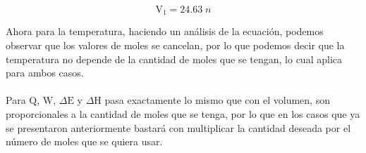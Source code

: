 \documentclass[12pt]{article}
\begin{document}
\begin{displaymath}
	\mathrm{V}_1=24.63\;n
\end{displaymath}

Ahora para la temperatura, haciendo un análisis de la ecuación, podemos observar que los valores de moles se cancelan, por lo que podemos decir que la temperatura no depende de la cantidad de moles que se tengan, lo cual aplica para ambos casos.\\
\\
Para $\mathrm{Q}$, $\mathrm{W}$, $\Delta\mathrm{E}$ y $\Delta\mathrm{H}$ pasa exactamente lo mismo que con el volumen, son proporcionales a la cantidad de moles que se tenga, por lo que en los casos que ya se presentaron anteriormente bastará con multiplicar la cantidad deseada por el número de moles que se quiera usar.
\end{document}
